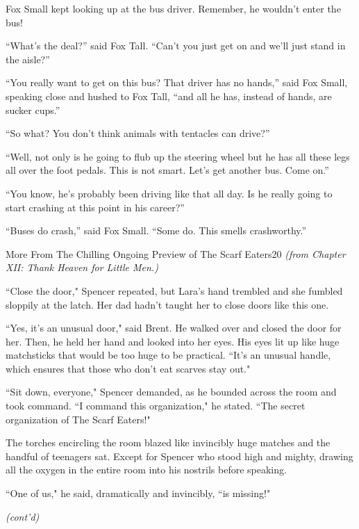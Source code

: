 \documentclass[12pt,twoside]{report}
\begin{document}
Fox Small kept looking up at the bus driver.  Remember, he wouldn't
enter the bus!

``What's the deal?'' said Fox Tall.  ``Can't you just get on and we'll
just stand in the aisle?''

``You really want to get on this bus?  That driver has no hands,''
said Fox Small, speaking close and hushed to Fox Tall, ``and all he
has, instead of hands, are sucker cups.''  

``So what?  You don't think
animals with tentacles can drive?''

``Well, not only is he going to flub up the steering wheel but he has
all these legs all over the foot pedals.  This is not smart.  Let's
get another bus.  Come on.''

``You know, he's probably been driving like that all day.  Is he
really going to start crashing at this point in his career?''

``Buses do crash,'' said Fox Small.  ``Some do.  This smells
crashworthy.''

	\begin{sidebar}{More From The Chilling Ongoing Preview of The Scarf Eaters}{20}
		\textit{(from Chapter XII: Thank Heaven for Little Men.)}\vspace{6pt}
		
		``Close the door," Spencer repeated, but Lara's hand trembled and she fumbled sloppily at the latch. Her dad hadn't taught her to close doors like this one.\vspace{6pt}

		``Yes, it's an unusual door," said Brent. He walked over and closed the door for her. Then, he held her hand and looked into her eyes. His eyes lit up like huge matchsticks that would be too huge to be practical. ``It's an unusual handle, which ensures that those who don't eat scarves stay out."\vspace{6pt}

		``Sit down, everyone," Spencer demanded, as he bounded across the room and took command. ``I command this organization," he stated. ``The secret organization of The Scarf Eaters!"\vspace{6pt}

		The torches encircling the room blazed like invincibly huge matches and the handful of teenagers sat. Except for Spencer who stood high and mighty, drawing all the oxygen in the entire room into his nostrils before speaking.\vspace{6pt}

		``One of us," he said, dramatically and invincibly, ``is missing!"\vspace{6pt}

		\textit{(cont'd)}\vspace{6pt}
	\end{sidebar}
\end{document}
